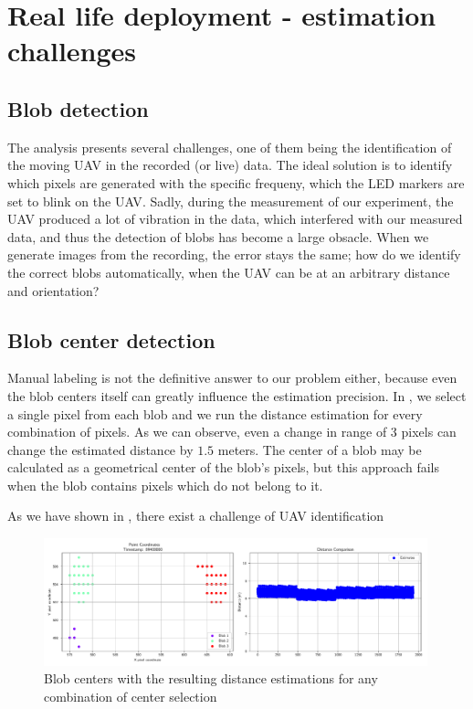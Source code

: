 \section{Real life deployment - estimation challenges}

\subsection{Blob detection}
The analysis presents several challenges, one of them being the identification of the moving \ac{UAV} in the recorded
(or live) data. The ideal solution is to identify which pixels are generated with the specific frequeny, which the \ac{LED}
markers are set to blink on the \ac{UAV}. Sadly, during the measurement of our experiment, the \ac{UAV} produced a lot
of vibration in the data, which interfered with our measured data, and thus the detection of blobs has become a large obsacle.
When we generate images from the recording, the error stays the same; how do we identify the correct blobs automatically, when
the \ac{UAV} can be at an arbitrary distance and orientation?

\subsection{Blob center detection}
Manual labeling is not the definitive answer to our problem either, because even the blob centers itself can greatly influence the estimation precision. In , we select a single pixel from each blob and we run the distance estimation
for every combination of pixels. As we can observe, even a change in range of 3 pixels can change the estimated distance by
$1.5$ meters. The center of a blob may be calculated as a geometrical center of the blob's pixels, but this approach fails
when the blob contains pixels which do not belong to it.

As we have shown in , there exist a challenge of \ac{UAV} identification 
\begin{figure}[H]
	\centering
	\includegraphics[width=0.99\textwidth]{./fig/pgfplot/estimation_selection_1.pdf}
	\caption{Blob centers with the resulting distance estimations for any combination of center selection}
	\label{fig:blob_comb}
\end{figure}


